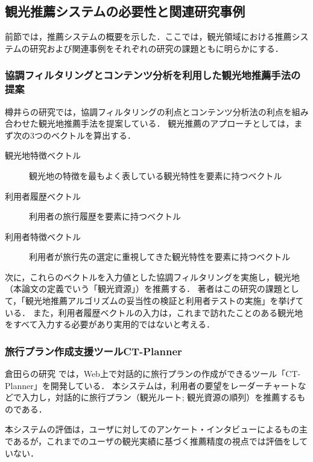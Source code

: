 \documentclass{jsarticle}
\begin{document}
\subsection{観光推薦システムの必要性と関連研究事例}

前節では，推薦システムの概要を示した．ここでは，観光領域における推薦システムの研究および関連事例をそれぞれの研究の課題ともに明らかにする．

\subsubsection{協調フィルタリングとコンテンツ分析を利用した観光地推薦手法の提案}

樽井らの研究\cite{tarui}では，協調フィルタリングの利点とコンテンツ分析法の利点を組み合わせた観光地推薦手法を提案している．
観光推薦のアプローチとしては，まず次の3つのベクトルを算出する．

\begin{description}
\item[観光地特徴ベクトル] 観光地の特徴を最もよく表している観光特性を要素に持つベクトル
\item[利用者履歴ベクトル] 利用者の旅行履歴を要素に持つベクトル
\item[利用者特徴ベクトル] 利用者が旅行先の選定に重視してきた観光特性を要素に持つベクトル
\end{description}

次に，これらのベクトルを入力値とした協調フィルタリングを実施し，観光地（本論文の定義でいう「観光資源」）を推薦する．
著者はこの研究の課題として，「観光地推薦アルゴリズムの妥当性の検証と利用者テストの実施」を挙げている．
また，利用者履歴ベクトルの入力は，これまで訪れたことのある観光地をすべて入力する必要があり実用的ではないと考える．

\subsubsection{旅行プラン作成支援ツールCT-Planner}

倉田らの研究\cite{ctplanner}\cite{ctplanner2}\cite{ctplanner3}\cite{ctplanner3b}\cite{ctplanner4}\cite{ctplanner5} では，Web上で対話的に旅行プランの作成ができるツール「CT-Planner\cite{ctplanner_web}」を開発している．
本システムは，利用者の要望をレーダーチャートなどで入力し，対話的に旅行プラン（観光ルート; 観光資源の順列）を推薦するものである．

本システムの評価は，ユーザに対してのアンケート・インタビューによるもの主であるが，これまでのユーザの観光実績に基づく推薦精度の視点では評価をしていない．
\end{document}

